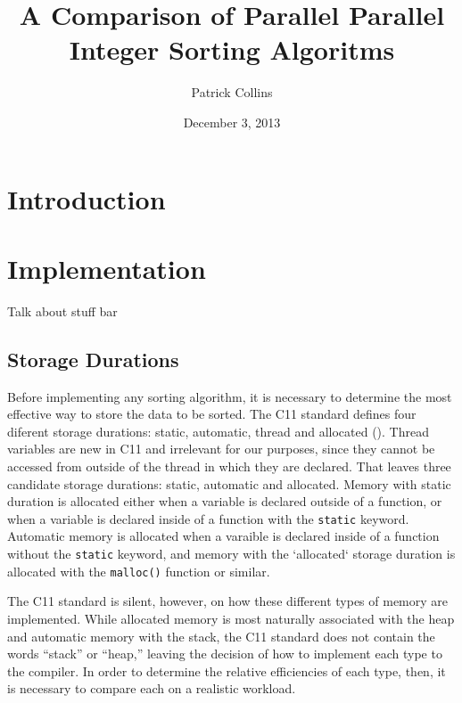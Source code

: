 \documentclass{article}
\begin{document}
\title{A Comparison of Parallel Parallel Integer Sorting Algoritms}
\author{Patrick Collins}
\date{December 3, 2013}
\maketitle


\section{Introduction}

\section{Implementation}
Talk about stuff bar
\subsection{Storage Durations}

Before implementing any sorting algorithm, it is necessary to
determine the most effective way to store the data to be
sorted. The C11 standard defines four diferent storage durations:
static, automatic, thread and allocated (\cite[\S 6.2.4]{CStd}).
Thread variables are new in C11 and irrelevant for our purposes, since they cannot be
accessed from outside of the thread in which they are declared. That
leaves three candidate storage durations: static, automatic and
allocated. Memory with static duration is allocated either when a
variable is declared outside of a
function, or when a variable is declared inside of a function with the \texttt{static}
keyword. Automatic memory is allocated when a varaible is declared
inside of a function without the \texttt{static} keyword, and memory
with the `allocated` storage duration is allocated with the
\texttt{malloc()} function or similar.

The C11 standard is silent, however, on how these different types of
memory are implemented. While allocated memory is most naturally
associated with the heap and automatic memory with the stack, the C11
standard does not contain the words ``stack'' or ``heap,'' leaving the
decision of how to implement each type to the compiler. In order to
determine the relative efficiencies of each type, then, it is
necessary to compare each on a realistic workload.
\end{document}
